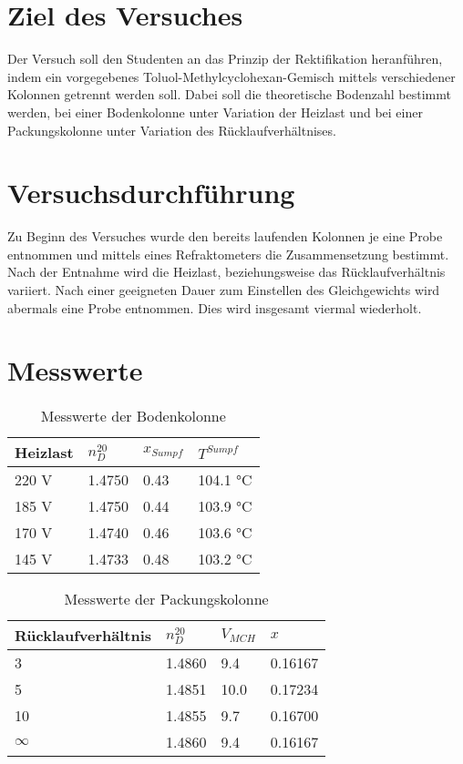 \documentclass{article}
\begin{document}
%
%

\noindent
\section{Ziel des Versuches}
Der Versuch soll den Studenten an das Prinzip der Rektifikation heranführen, indem ein
vorgegebenes Toluol-Methylcyclohexan-Gemisch mittels verschiedener Kolonnen getrennt
werden soll. Dabei soll die theoretische Bodenzahl bestimmt werden, bei einer
Bodenkolonne unter Variation der Heizlast und bei einer Packungskolonne unter Variation
des Rücklaufverhältnises.
\section{Versuchsdurchführung}
Zu Beginn des Versuches wurde den bereits laufenden Kolonnen je eine Probe entnommen
und mittels eines Refraktometers die Zusammensetzung bestimmt. Nach der Entnahme wird
die Heizlast, beziehungsweise das Rücklaufverhältnis variiert. Nach einer geeigneten Dauer
zum Einstellen des Gleichgewichts wird abermals eine Probe entnommen. Dies wird
insgesamt viermal wiederholt.
\section{Messwerte}
\begin{table}[ht!]
  \centering
 \begin{tabularx}{\textwidth}{XXXX}
Heizlast & $n^{20}_D$ & $x_{Sumpf}$ &  $T^{Sumpf}$  \\
\hline
\rowcolor{LightCyan}
220 V & 1.4750 & 0.43 &  104.1 \si\celsius    \\
185 V & 1.4750 & 0.44 &  103.9 \si\celsius    \\
170 V & 1.4740 & 0.46 &  103.6 \si\celsius    \\
145 V & 1.4733 & 0.48 &  103.2 \si\celsius    \\
\end{tabularx}
  \caption{Messwerte der Bodenkolonne}

\end{table}

\begin{table}[ht!]
  \centering
 \begin{tabularx}{\textwidth}{XXXX}
Rücklaufverhältnis & $n^{20}_D$ & $V_{MCH}$ & $x$  \\
\hline
\rowcolor{LightCyan}
3 & 1.4860 & 9.4 &  0.16167   \\
5  & 1.4851 & 10.0 &  0.17234   \\
\rowcolor{LightCyan}
10  & 1.4855 & 9.7 & 0.16700   \\
$\infty$  & 1.4860 & 9.4 &  0.16167  \\
\end{tabularx}
  \caption{Messwerte der Packungskolonne}
\end{table}
\end{document}
